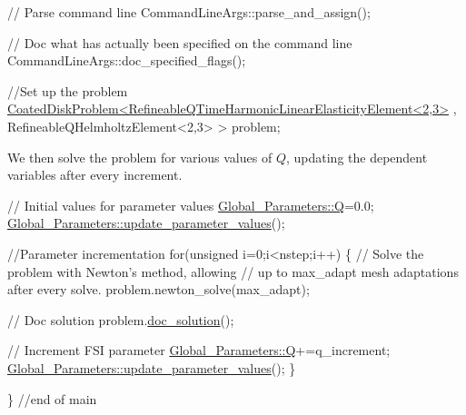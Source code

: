 \begin{DoxyCodeInclude}
 \textcolor{comment}{// Parse command line}
 CommandLineArgs::parse\_and\_assign(); 
 
 \textcolor{comment}{// Doc what has actually been specified on the command line}
 CommandLineArgs::doc\_specified\_flags();

 \textcolor{comment}{//Set up the problem}
 \hyperlink{classCoatedDiskProblem}{CoatedDiskProblem<RefineableQTimeHarmonicLinearElasticityElement<2,3>}
      ,
                   RefineableQHelmholtzElement<2,3> > problem; 

\end{DoxyCodeInclude}


We then solve the problem for various values of $ Q $, updating the dependent variables after every increment.


\begin{DoxyCodeInclude}

  
 \textcolor{comment}{// Initial values for parameter values}
 \hyperlink{namespaceGlobal__Parameters_a7814fddf663e56168174a42d2cd6b4c1}{Global\_Parameters::Q}=0.0; 
 \hyperlink{namespaceGlobal__Parameters_ae0f9a80fb7510dbfbbef22582da231b7}{Global\_Parameters::update\_parameter\_values}();

 \textcolor{comment}{//Parameter incrementation}
 \textcolor{keywordflow}{for}(\textcolor{keywordtype}{unsigned} i=0;i<nstep;i++)
  \{
   \textcolor{comment}{// Solve the problem with Newton's method, allowing}
   \textcolor{comment}{// up to max\_adapt mesh adaptations after every solve.}
   problem.newton\_solve(max\_adapt);

   \textcolor{comment}{// Doc solution}
   problem.\hyperlink{classCoatedDiskProblem_af8e103d494f526c0e24c0c4ccef4ea6b}{doc\_solution}();

   \textcolor{comment}{// Increment FSI parameter}
   \hyperlink{namespaceGlobal__Parameters_a7814fddf663e56168174a42d2cd6b4c1}{Global\_Parameters::Q}+=q\_increment;
   \hyperlink{namespaceGlobal__Parameters_ae0f9a80fb7510dbfbbef22582da231b7}{Global\_Parameters::update\_parameter\_values}();
  \}
 
\} \textcolor{comment}{//end of main}

\end{DoxyCodeInclude}




 

